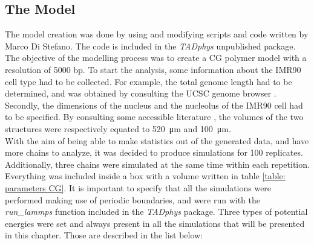 
\subsection{The Model} \label{chap: the model description}
The model creation was done by using and modifying scripts and code written by Marco Di Stefano. The code is included in the \textit{TADphys} unpublished package.
The objective of the modelling process was to create a CG polymer model with a resolution of 5000 bp. To start the analysis, some information about the IMR90 cell type had to be collected. For example, the total genome length had to be determined, and was obtained by consulting the UCSC genome browser
\cite{UCSCGenomeBrowser}.
Secondly, the dimensions of the nucleus and the nucleolus of the IMR90 cell had to be specified. By consulting some accessible literature
\cite{ehlerHumanFoetalLung1996,ingramHiCImplementationGenome2020,maiserSuperresolutionSituAnalysis2020},
the volumes of the two structures were respectively equated to \SI{520}{\micro\metre} and \SI{100}{\micro\metre}.\\

With the aim of being able to make statistics out of the generated data, and have more chains to analyze, it was decided to produce simulations for 100 replicates. Additionally, three chains were simulated at the same time within each repetition. Everything was included inside a box with a volume written in table \ref{table: parameters CG}. 
It is important to specify that all the simulations were performed making use of periodic boundaries, and were run with the \textit{run\_lammps} function included in the \textit{TADphys} package.
Three types of potential energies were set and always present in all the simulations that will be presented in this chapter. Those are described in the list below:

